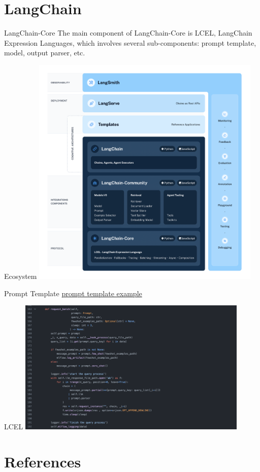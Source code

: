 \documentclass[11.5pt]{beamer}
\begin{document}
\section{LangChain}
\begin{frame}{LangChain-Core}
The main component of LangChain-Core is LCEL, LangChain Expression Languages,
which involves several sub-components: prompt template, model, output parser,
etc.
\end{frame}


\begin{frame}{Ecosystem}
\includegraphics[width=11cm]{Figures/fig6.png}
\end{frame}


\begin{frame}{Prompt Template}
\href{https://github.com/githubjacky/llm-research/blob/main/examples/english_address_to_chinese/main.ipynb}{prompt template example}
\end{frame}


\begin{frame}{LCEL}
\includegraphics[width=11cm]{Figures/fig7.png}
\end{frame}


\section{References}


\begin{frame}[allowframebreaks]{}
\renewcommand{\section}[2]{}%

\end{frame}
\end{document}
